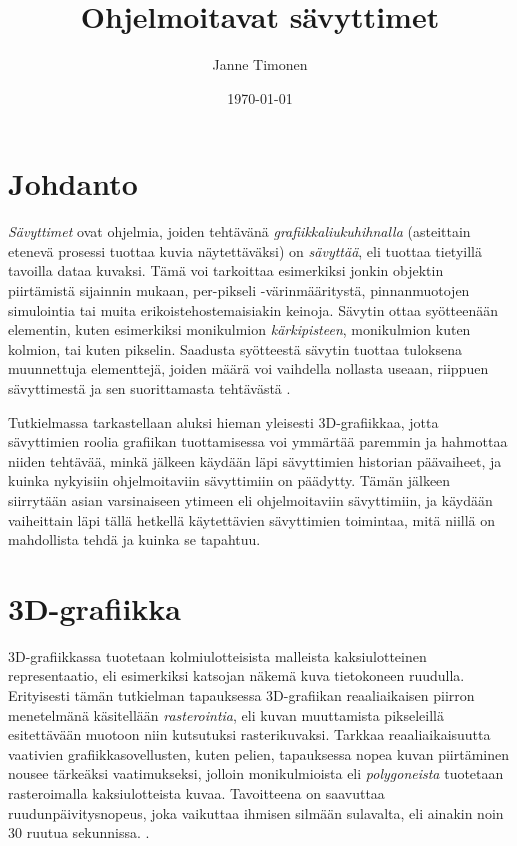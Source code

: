\documentclass[finnish]{tktltiki2}
\title{Ohjelmoitavat sävyttimet}
\author{Janne Timonen}
\date{\today}
\theoremstyle{definition}
\theoremstyle{remark}
\begin{document}

\frontmatter      %

\maketitle        %
\makeabstract     %

\tableofcontents  %


\mainmatter       %

\section{Johdanto}


\emph{Sävyttimet} ovat ohjelmia, joiden tehtävänä \emph{grafiikkaliukuhihnalla} (asteittain etenevä prosessi tuottaa kuvia näytettäväksi) on \emph{sävyttää}, eli tuottaa tietyillä tavoilla dataa kuvaksi. Tämä voi tarkoittaa esimerkiksi jonkin objektin piirtämistä sijainnin mukaan, per-pikseli -värinmääritystä, pinnanmuotojen simulointia tai muita erikoistehostemaisiakin keinoja. Sävytin ottaa syötteenään elementin, kuten esimerkiksi monikulmion \emph{kärkipisteen}, monikulmion kuten kolmion, tai kuten pikselin. Saadusta syötteestä sävytin tuottaa tuloksena muunnettuja elementtejä, joiden määrä voi vaihdella nollasta useaan, riippuen sävyttimestä ja sen suorittamasta tehtävästä \cite[s. 500]{Gre14}.

Tutkielmassa tarkastellaan aluksi hieman yleisesti 3D-grafiikkaa, jotta sävyttimien roolia grafiikan tuottamisessa voi ymmärtää paremmin ja hahmottaa niiden tehtävää, minkä jälkeen käydään läpi sävyttimien historian päävaiheet, ja kuinka nykyisiin ohjelmoitaviin sävyttimiin on päädytty. Tämän jälkeen siirrytään asian varsinaiseen ytimeen eli ohjelmoitaviin sävyttimiin, ja käydään vaiheittain läpi tällä hetkellä käytettävien sävyttimien toimintaa, mitä niillä on mahdollista tehdä ja kuinka se tapahtuu.

\section{3D-grafiikka}

3D-grafiikkassa tuotetaan kolmiulotteisista malleista kaksiulotteinen representaatio, eli esimerkiksi katsojan näkemä kuva tietokoneen ruudulla. Erityisesti tämän tutkielman tapauksessa 3D-grafiikan reaaliaikaisen piirron menetelmänä käsitellään \emph{rasterointia}, eli kuvan muuttamista pikseleillä esitettävään muotoon niin kutsutuksi rasterikuvaksi. Tarkkaa reaaliaikaisuutta vaativien grafiikkasovellusten, kuten pelien, tapauksessa nopea kuvan piirtäminen nousee tärkeäksi vaatimukseksi, jolloin monikulmioista eli \emph{polygoneista} tuotetaan rasteroimalla kaksiulotteista kuvaa. Tavoitteena on saavuttaa ruudunpäivitysnopeus, joka vaikuttaa ihmisen silmään sulavalta, eli ainakin noin 30 ruutua sekunnissa. \cite{Gre14}. 
\end{document}
